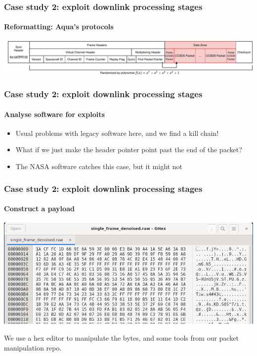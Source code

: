 \documentclass{beamer}
\begin{document}
\begin{frame}
  \frametitle{Case study 2: exploit downlink processing stages}
  \framesubtitle{Reformatting: Aqua's protocols}
  \includegraphics[width=\textwidth]{images/cadu_diagram.pdf}
\end{frame}

\begin{frame}
  \frametitle{Case study 2: exploit downlink processing stages}
  \framesubtitle{Analyse software for exploits}

  \begin{itemize}[<+->]
    \item Usual problems with legacy software here, and we find a kill chain!
    \item What if we just make the header pointer point past the end of the packet?
    \item The NASA software catches this case, but it might not
  \end{itemize}
\end{frame}

\begin{frame}
  \frametitle{Case study 2: exploit downlink processing stages}
  \framesubtitle{Construct a payload}
  \includegraphics[width=\textwidth]{images/hex.png}

  We use a hex editor to manipulate the bytes, and some tools from our packet manipulation repo.
\end{frame}
\end{document}
